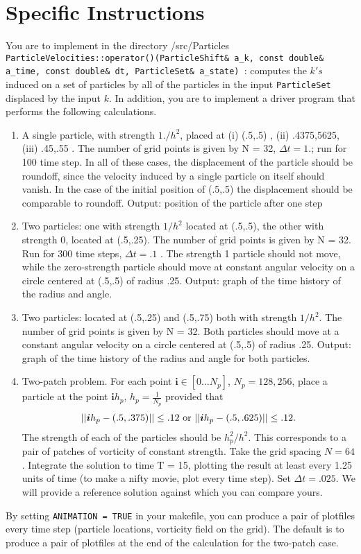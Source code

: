 \documentclass[11pt]{article}
\begin{document}
\section*{Specific Instructions }
You are to implement in the directory /src/Particles
{\tt ParticleVelocities::operator()(ParticleShift\& a\_k, const double\& a\_time, const double\& dt, ParticleSet\& a\_state) }: computes the $k's$ induced on a set of particles by all of the particles in the input {\tt ParticleSet} displaced by the input $k$.
In addition, you are to implement a driver program that performs the following calculations. 
\begin{enumerate}
\item
  A single particle, with strength $1./h^2$, placed at (i) (.5,.5) , (ii) .4375,5625, (iii) .45,.55 . The number of grid points is given by N = 32, $\Delta t = 1.$; run for 100 time step.
In all of these cases, the displacement of the particle should be roundoff, since the velocity induced by a single particle on itself should vanish. In the case of the initial position of (.5,.5) the displacement should be comparable to roundoff. Output: position of the particle after one step
\item
Two particles: one with strength $1/h^2$ located at (.5,.5), the other with strength 0, located at (.5,.25). The number of grid points is given by N = 32. Run for 300 time steps, $\Delta t = .1$ . The strength 1 particle should not move, while the zero-strength particle should move at constant angular velocity on a circle centered at (.5,.5) of radius .25. Output: graph of the time history of the radius and angle.
\item
Two particles: located at (.5,.25) and (.5,.75) both with strength $1/h^2$. The number of grid points is given by N = 32. Both particles should move at a  constant angular velocity on a circle centered at (.5,.5) of radius .25. Output: graph of the time history of the radius and angle for both particles.
\item 
Two-patch problem. For each point 
$ \boldsymbol{i}\in [0 \dots N_p]$, $N_p = 128, 256$, place a particle at the point $\boldsymbol{i} h_p$, $h_p = \frac{1}{N_p}$ provided that 
\begin{gather*}
|| \boldsymbol{i}h_p - (.5,.375) || \leq .12 \hbox { or } || \boldsymbol{i} h_p - (.5,.625) || \leq .12 .
\end{gather*}
The strength of each of the particles should be $h_p^2/h^2$. This corresponds to a pair of patches of vorticity of constant strength. Take the grid spacing $N = 64$. Integrate the solution to time T = 15, plotting the result at least every 1.25 units of time (to make a nifty movie, plot every time step). Set $\Delta t = .025$. We will provide a reference solution against which you can compare yours.
\end{enumerate}
By setting {\tt ANIMATION = TRUE} in your makefile, you can produce a pair of plotfiles every time step (particle locations, vorticity field on the grid). The default is to produce a pair of plotfiles at the end of the calculation for the two-patch case.
\end{document}
